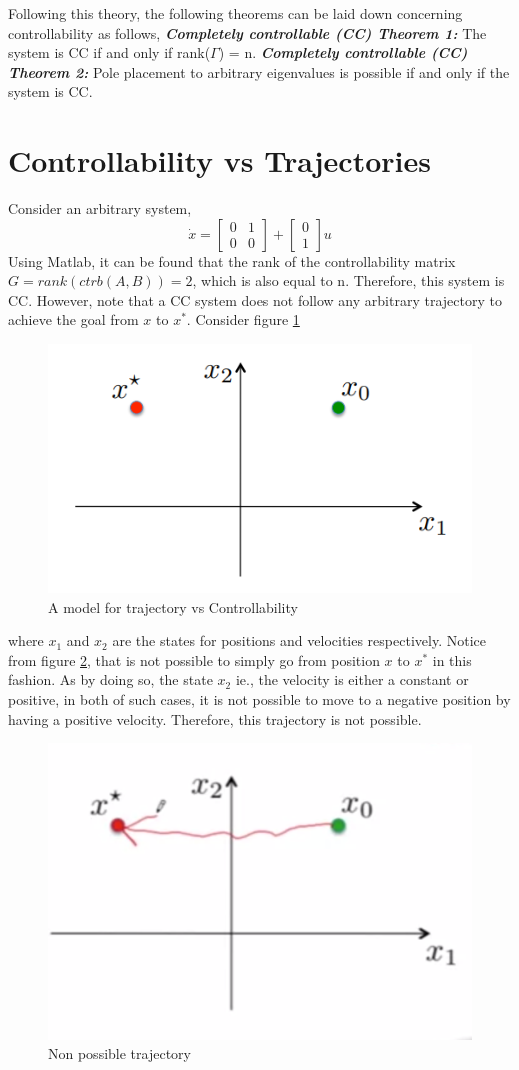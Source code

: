Following this theory, the following theorems can be laid down concerning controllability as follows,
\textbf{\textit{Completely controllable (CC) Theorem 1: }} The system is CC if and only if rank($\Gamma$) = n.
\textbf{\textit{Completely controllable (CC) Theorem 2: }} Pole placement to arbitrary eigenvalues is possible if and only if the system is CC.

\section{Controllability vs Trajectories}
Consider an arbitrary system,
\begin{equation}
	\dot{x} = \begin{bmatrix}
	0 &  1 \\ 0 & 0
	\end{bmatrix} + \begin{bmatrix}
	0 \\ 1
	\end{bmatrix}u
\end{equation}
Using Matlab, it can be found that the rank of the controllability matrix $G = rank(ctrb(A,B)) = 2$, which is also equal to n. Therefore, this system is CC. However, note that a CC system does not follow any arbitrary trajectory to achieve the goal from $x$ to $x^{*}$. Consider figure \ref{Fig_2_ch_8_rand1}
\begin{figure}[h!]
	\centering
	\includegraphics[width=0.5\linewidth]{Bilder/SS1.png}
	\caption{A model for trajectory vs Controllability}
	\label{Fig_2_ch_8_rand1}
\end{figure}
where $x_1$ and $x_2$ are the states for positions and velocities respectively. Notice from figure \ref{Fig_2_ch_8_rand2}, that is not possible to simply go from position  $x$ to $x^{*}$ in this fashion. As by doing so, the state $x_2$ ie., the velocity is either a constant or positive, in both of such cases, it is not possible to move to a negative position by having a positive velocity. Therefore, this trajectory is not possible.
\begin{figure}[h!]
	\centering
	\includegraphics[width=0.5\linewidth]{Bilder/SS2.png}
	\caption{Non possible trajectory}
	\label{Fig_2_ch_8_rand2}
\end{figure}

